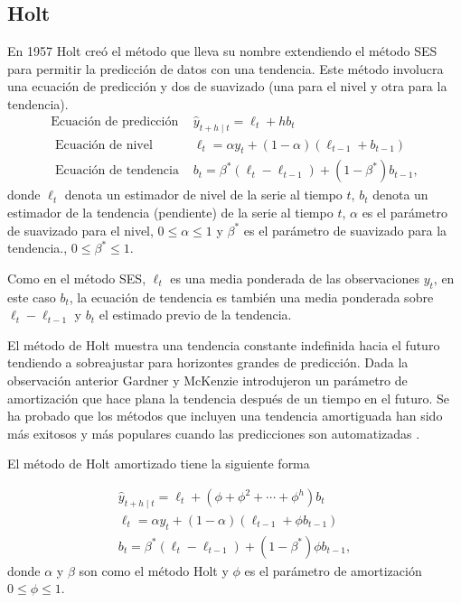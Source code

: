 \subsection{Holt}

En 1957 Holt creó el método que lleva su nombre extendiendo el método SES para permitir la predicción de datos con una tendencia. Este método involucra una ecuación de predicción y dos de suavizado (una para el nivel y otra para la tendencia).
\begin{equation*}
	\begin{array}{lcl} 
		 \text {Ecuación de predicción} & \hat{y}_{t+h \mid t}=\ell_{t}+h b_{t} \\
		\text { Ecuación de nivel } & \ell_{t}=\alpha y_{t}+(1-\alpha)\left(\ell_{t-1}+b_{t-1}\right) \\
		\text { Ecuación de tendencia } & b_{t} =\beta^{*}\left(\ell_{t}-\ell_{t-1}\right)+\left(1-\beta^{*}\right) b_{t-1},
	\end{array} 
\end{equation*}
donde $\ell_{t}$ denota un estimador de nivel de la serie al tiempo $t$,  $b_{t}$ denota un estimador de la tendencia (pendiente) de la serie al tiempo $t$, $\alpha$ es el parámetro de suavizado para el nivel, $0 \leq \alpha \leq 1$ y $\beta^*$ es el parámetro de suavizado para la tendencia., $0 \leq \beta^* \leq 1$.

Como en el método SES, $\ell_{t}$ es una media ponderada de las observaciones $y_t$, en este caso $b_t$, la ecuación de tendencia es también una media ponderada sobre $\ell_{t}-\ell_{t-1}$ y $b_t$ el estimado previo de la tendencia. 

El método de Holt muestra una tendencia constante indefinida hacia el futuro tendiendo a sobreajustar para horizontes grandes de predicción. Dada la observación anterior Gardner y McKenzie introdujeron un parámetro de amortización que hace plana la tendencia después de un tiempo en el futuro. Se ha probado que los métodos que incluyen una tendencia amortiguada han sido más exitosos y más populares cuando las predicciones son automatizadas \parencite{hyndmanForecastingPrinciplesPractice2018}. 

El método de Holt amortizado tiene la siguiente forma

\begin{equation*}
	\begin{array}{cl} 
	\hat{y}_{t+h \mid t} =\ell_{t}+\left(\phi+\phi^{2}+\cdots+\phi^{h}\right) b_{t} \\
	\ell_{t} =\alpha y_{t}+(1-\alpha)\left(\ell_{t-1}+\phi b_{t-1}\right) \\
	b_{t}=\beta^{*}\left(\ell_{t}-\ell_{t-1}\right)+\left(1-\beta^{*}\right) \phi b_{t-1},
	\end{array} 
\end{equation*}
donde $\alpha$ y $\beta$ son como el método Holt y $\phi$ es el parámetro de amortización $0 \leq \phi \leq 1$.

